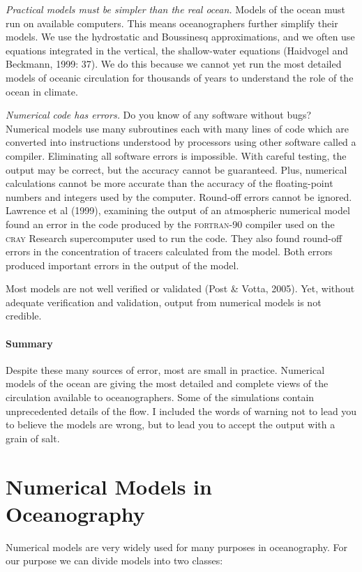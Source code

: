 \textit{Practical models must be simpler than the real ocean.} Models
of the ocean must run on available computers. This means oceanographers further
simplify their models. We use the hydrostatic and Boussinesq approximations, and we often use equations integrated in the vertical, the shallow-water
equations (Haidvogel and Beckmann, 1999: 37). We do this because we cannot yet run the
most detailed models of oceanic circulation for thousands of years to understand
the role of the ocean in climate.

\textit{Numerical code has errors.} Do you know of any software without
bugs? Numerical models use many subroutines each with many lines of code
which are converted into instructions understood by processors using other
software called a compiler. Eliminating all software errors is impossible. With
careful testing, the output may be correct, but the accuracy
cannot be guaranteed. Plus, numerical calculations cannot be more accurate than the
accuracy of the floating-point numbers and integers used by the computer.
Round-off errors cannot be ignored. Lawrence et al (1999), examining the output
of an atmospheric numerical model found an error in the code produced by the
\textsc{fortran-90} compiler used on the \textsc{cray} Research
supercomputer used to run the code. They also found round-off errors in the
concentration of tracers calculated from the model. Both errors produced
important errors in the output of the model.

Most models are not well verified or validated (Post \& Votta, 2005). Yet, without adequate verification and validation, output from numerical models is not credible.

\paragraph{Summary}
Despite these many sources of error, most are small in practice. Numerical models
of the ocean are giving the most detailed and complete views of the
circulation available to oceanographers. Some of the simulations contain
unprecedented details of the flow. I included the words of warning not to lead you to believe
the models are wrong, but to lead you to accept the output with a grain of salt.

\section{Numerical Models in Oceanography}
Numerical models are very widely used for many purposes in oceanography. For our purpose we
can divide models into two classes:

